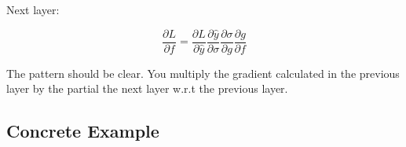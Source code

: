 Next layer:

\begin{equation}
    \frac{\partial L}{\partial f} = \frac{\partial L}{\partial \hat{y}} \frac{\partial \hat{y}}{\partial \sigma} \frac{\partial \sigma}{\partial g} \frac{\partial g}{\partial f}
\end{equation}

The pattern should be clear. You multiply the gradient calculated in the previous layer by the partial the next layer w.r.t the previous layer.

\subsection{Concrete Example}


